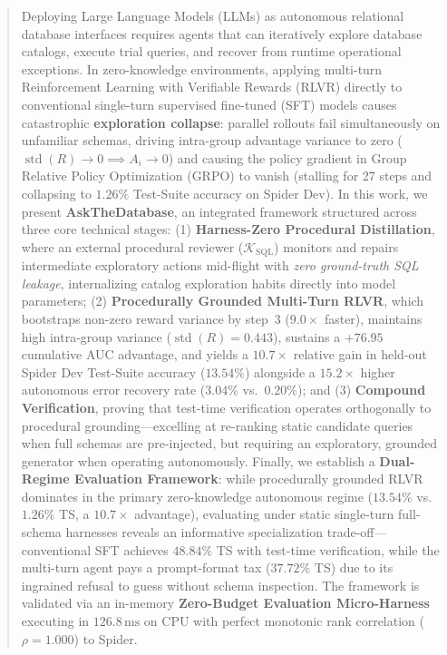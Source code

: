 \documentclass{article}
\theoremstyle{plain}
\theoremstyle{definition}
\theoremstyle{remark}
\begin{document}
\begin{abstract}
Deploying Large Language Models (LLMs) as autonomous relational database interfaces requires agents that can iteratively explore database catalogs, execute trial queries, and recover from runtime operational exceptions. In zero-knowledge environments, applying multi-turn Reinforcement Learning with Verifiable Rewards (RLVR) directly to conventional single-turn supervised fine-tuned (SFT) models causes catastrophic \textbf{exploration collapse}: parallel rollouts fail simultaneously on unfamiliar schemas, driving intra-group advantage variance to zero ($\operatorname{std}(R) \to 0 \implies A_i \to 0$) and causing the policy gradient in Group Relative Policy Optimization (GRPO) to vanish (stalling for 27 steps and collapsing to $1.26\%$ Test-Suite accuracy on Spider Dev). In this work, we present \textbf{AskTheDatabase}, an integrated framework structured across three core technical stages: (1) \textbf{Harness-Zero Procedural Distillation}, where an external procedural reviewer ($\mathcal{K}_{\text{SQL}}$) monitors and repairs intermediate exploratory actions mid-flight with \emph{zero ground-truth SQL leakage}, internalizing catalog exploration habits directly into model parameters; (2) \textbf{Procedurally Grounded Multi-Turn RLVR}, which bootstraps non-zero reward variance by step~3 ($9.0\times$ faster), maintains high intra-group variance ($\operatorname{std}(R) = 0.443$), sustains a $+76.95$ cumulative AUC advantage, and yields a $10.7\times$ relative gain in held-out Spider Dev Test-Suite accuracy ($13.54\%$) alongside a $15.2\times$ higher autonomous error recovery rate ($3.04\%$ vs.\ $0.20\%$); and (3) \textbf{Compound Verification}, proving that test-time verification operates orthogonally to procedural grounding—excelling at re-ranking static candidate queries when full schemas are pre-injected, but requiring an exploratory, grounded generator when operating autonomously. Finally, we establish a \textbf{Dual-Regime Evaluation Framework}: while procedurally grounded RLVR dominates in the primary zero-knowledge autonomous regime ($13.54\%$ vs.\ $1.26\%$ TS, a $10.7\times$ advantage), evaluating under static single-turn full-schema harnesses reveals an informative specialization trade-off—conventional SFT achieves $48.84\%$ TS with test-time verification, while the multi-turn agent pays a prompt-format tax ($37.72\%$ TS) due to its ingrained refusal to guess without schema inspection. The framework is validated via an in-memory \textbf{Zero-Budget Evaluation Micro-Harness} executing in $126.8\,\text{ms}$ on CPU with perfect monotonic rank correlation ($\rho = 1.000$) to Spider.
\end{abstract}
\end{document}
